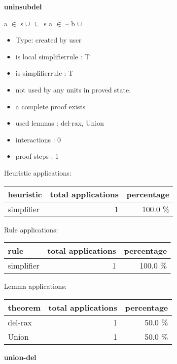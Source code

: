 \documentclass[a4paper]{article}
\begin{document}
{\LARGE\bf uninsubdel}\label{lemma-uninsubdel}

\medskip

 \Fol \Not a $\in$ s $\cup$  \And {} $\subseteq$ s \Imp \Not a $\in$  -- b $\cup$ 

\begin{itemize}

\item Type: created by user

\item is local simplifierrule : T
\item is simplifierrule : T
\item not used by any units in proved state.
\item       a complete proof exists
\item       used lemmas  : del-rax, Union
\item       interactions : 0
\item       proof steps  : 1
\end{itemize}

\medskip


Heuristic applications:

\begin{supertabular}{l|r|r}
heuristic	& total applications & percentage \\ \hline
simplifier & 1 & 100.0 \% \\

\end{supertabular}

Rule applications:

\begin{supertabular}{l|r|r}
rule	        & total applications & percentage \\ \hline
simplifier & 1 & 100.0 \% \\

\end{supertabular}

Lemma applications:

\begin{supertabular}{l|r|r}
theorem	        & total applications & percentage \\ \hline
del-rax & 1 & 50.0 \% \\
Union & 1 & 50.0 \% \\

\end{supertabular}
\pagebreak

{\LARGE\bf union-del}\label{lemma-union-del}
\end{document}
